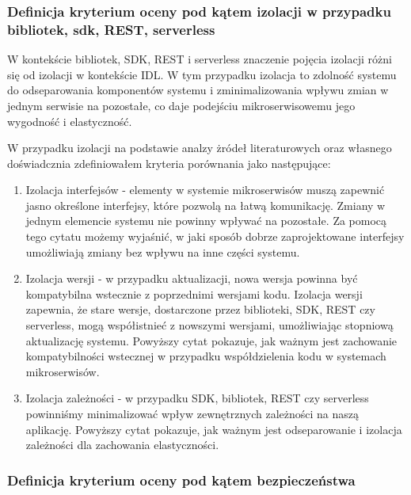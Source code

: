 \documentclass[runningheads,12pt]{llncs}
\begin{document}
\subsubsection{Definicja kryterium oceny pod kątem izolacji w przypadku bibliotek, sdk, REST, serverless}

W kontekście bibliotek, SDK, REST i serverless znaczenie pojęcia izolacji różni się od izolacji w kontekście IDL. W tym przypadku izolacja to zdolność systemu do odseparowania komponentów systemu i zminimalizowania wpływu zmian w jednym serwisie na pozostałe, co daje podejściu mikroserwisowemu jego wygodność i elastyczność.

W przypadku izolacji na podstawie analzy żródeł literaturowych oraz własnego doświadcznia zdefiniowałem kryteria porównania jako następujące:

\begin{enumerate}
    \item Izolacja interfejsów - elementy w systemie mikroserwisów muszą zapewnić jasno określone interfejsy, które pozwolą na łatwą komunikację. Zmiany w jednym elemencie systemu nie powinny wpływać na pozostałe.
    Za pomocą tego cytatu możemy wyjaśnić, w jaki sposób dobrze zaprojektowane interfejsy umożliwiają zmiany bez wpływu na inne części systemu. ~\cite[p. 75]{bloch2018effective}
    \item Izolacja wersji - w przypadku aktualizacji, nowa wersja powinna być kompatybilna wstecznie z poprzednimi wersjami kodu. Izolacja wersji zapewnia, że stare wersje, dostarczone przez biblioteki, SDK, REST czy serverless, mogą współistnieć z nowszymi wersjami, umożliwiając stopniową aktualizację systemu.
    Powyższy cytat pokazuje, jak ważnym jest zachowanie kompatybilności wstecznej w przypadku współdzielenia kodu w systemach mikroserwisów. ~\cite[p. 172]{fowler2012patterns}
    \item Izolacja zależności - w przypadku SDK, bibliotek, REST czy serverless powinniśmy minimalizować wpływ zewnętrznych zależności na naszą aplikację.
    Powyższy cytat pokazuje, jak ważnym jest odseparowanie i izolacja zależności dla zachowania elastyczności. ~\cite[p. 218]{martin2008clean}
\end{enumerate}

\subsubsection{Definicja kryterium oceny pod kątem bezpieczeństwa}
\end{document}

